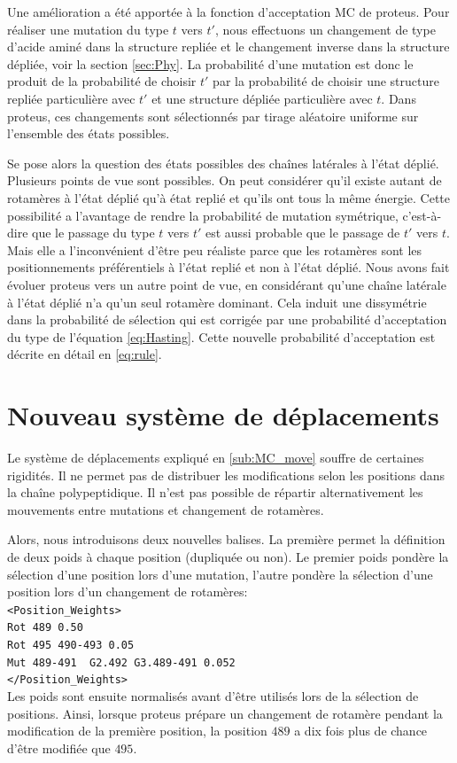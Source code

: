 Une amélioration a été apportée à la fonction d'acceptation MC de proteus. Pour réaliser une mutation du type $t$ vers $t'$, nous effectuons un changement de type d'acide aminé dans la structure repliée et le changement inverse dans la structure dépliée, voir la section \ref{sec:Phy}. La probabilité d'une mutation est donc le produit de la probabilité de choisir $t'$ par la probabilité de choisir une structure repliée particulière avec $t'$ et une structure dépliée particulière avec $t$. Dans proteus, ces changements sont sélectionnés par tirage aléatoire uniforme sur l'ensemble des états possibles. 

Se pose alors la question des états possibles des chaînes latérales à l'état déplié. Plusieurs points de vue sont possibles. On peut considérer qu'il existe autant de rotamères à l'état déplié qu'à état replié et qu'ils ont tous la même énergie. Cette possibilité a l'avantage de rendre la probabilité de mutation symétrique, c'est-à-dire que le passage du type $t$ vers $t'$ est aussi probable que le passage de $t'$ vers $t$. Mais elle a l'inconvénient d'être peu réaliste parce que les rotamères sont les positionnements préférentiels à l'état replié et non à l'état déplié. Nous avons fait évoluer proteus vers un autre point de vue, en considérant qu'une chaîne latérale à l'état déplié n'a qu'un seul rotamère dominant. Cela induit une dissymétrie dans la probabilité de sélection qui est corrigée par une probabilité d'acceptation du type de l'équation \ref{eq:Hasting}. Cette nouvelle probabilité d'acceptation est décrite en détail en \vref{eq:rule}.

\section{Nouveau système de déplacements}
\label{sec:newmove}
Le système de déplacements expliqué en \ref{sub:MC_move}  souffre de certaines rigidités. Il ne permet pas de distribuer les modifications selon les positions dans la chaîne polypeptidique. Il n'est pas possible de répartir alternativement les mouvements entre mutations et changement de rotamères.

Alors, nous introduisons deux nouvelles balises. La première permet la définition de deux poids à chaque position (dupliquée ou non). Le premier poids pondère la sélection d'une position lors d'une mutation, l'autre pondère la sélection d'une position lors d'un changement de rotamères:\\
\verb!<Position_Weights>! \\
\verb!Rot 489 0.50 ! \\
\verb!Rot 495 490-493 0.05 ! \\
\verb!Mut 489-491  G2.492 G3.489-491 0.052 ! \\
\verb!</Position_Weights>! \\
Les poids sont ensuite normalisés avant d'être utilisés lors de la sélection de positions. Ainsi, lorsque proteus prépare un changement de rotamère pendant la modification de la première position, la position $489$ a dix fois plus de chance d'être modifiée que $495$.

